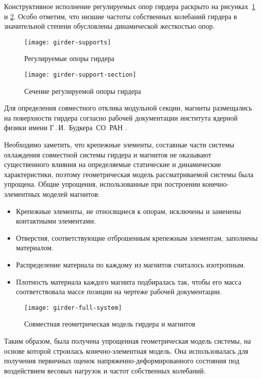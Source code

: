 Конструктивное исполнение регулируемых опор гирдера раскрыто на рисунках~\ref{fig:girder-supports} и \ref{fig:girder-support-section}. Особо отметим, что низшие частоты собственных колебаний гирдера в значительной степени обусловлены динамической жесткостью опор.

\begin{figure}[!htb]
	\centering
	\texttt{[image: girder-supports]}
	\caption{Регулируемые опоры гирдера} \label{fig:girder-supports}
\end{figure}

\begin{figure}[!htb]
	\centering
	\texttt{[image: girder-support-section]}
	\caption{Сечение регулируемой опоры гирдера} \label{fig:girder-support-section}
\end{figure}

Для определения совместного отклика модульной секции, магниты размещались на поверхности гирдера согласно рабочей документации института ядерной физики имени Г\,.\,И.~Будкера~СО~РАН .

Необходимо заметить, что крепежные элементы, составные части системы охлаждения совместной системы гирдера и магнитов не оказывают существенного влияния на определяемые статические и динамические характеристики, поэтому геометрическая модель рассматриваемой системы была упрощена. Общие упрощения, использованные при построении конечно-элементных моделей магнитов:
\begin{itemize}[topsep = 0pt, noitemsep]
	\item Крепежные элементы, не относящиеся к опорам, исключены и заменены контактными элементами.
	\item Отверстия, соответствующие отброшенным крепежным элементам, заполнены материалом.
	\item Распределение материала по каждому из магнитов считалось изотропным.
	\item Плотность материала каждого магнита подбиралась так, чтобы его масса соответствовала массе позиции на чертеже рабочей документации.
\end{itemize} 

\begin{figure}[!htb]
	\centering
	\texttt{[image: girder-full-system]}
	\caption{Совместная геометрическая модель гирдера и магнитов} \label{fig:girder-full-system}
\end{figure}

Таким образом, была получена упрощенная геометрическая модель системы, на основе которой строилась конечно-элементная модель. Она использовалась для получения первичных оценок напряженно-деформированного состояния под воздействием весовых нагрузок и частот собственных колебаний. 

